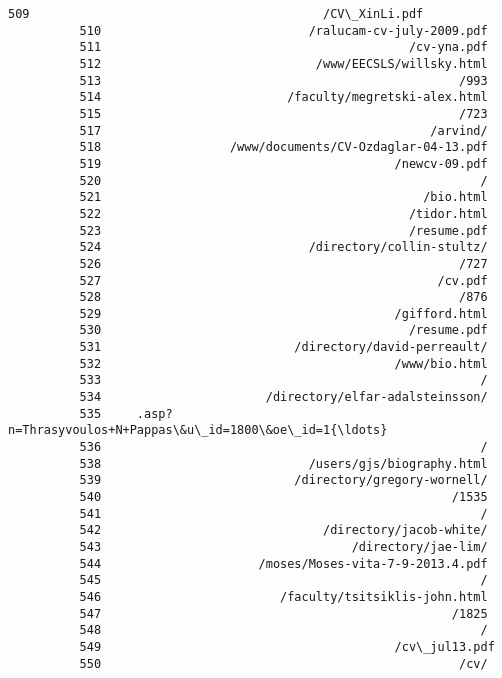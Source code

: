 \documentclass[11pt]{article}
\begin{document}
\begin{Verbatim}[commandchars=\\\{\}]
          509                                         /CV\_XinLi.pdf
          510                             /ralucam-cv-july-2009.pdf
          511                                           /cv-yna.pdf
          512                              /www/EECSLS/willsky.html
          513                                                  /993
          514                          /faculty/megretski-alex.html
          515                                                  /723
          517                                              /arvind/
          518                  /www/documents/CV-Ozdaglar-04-13.pdf
          519                                         /newcv-09.pdf
          520                                                     /
          521                                             /bio.html
          522                                           /tidor.html
          523                                           /resume.pdf
          524                             /directory/collin-stultz/
          526                                                  /727
          527                                               /cv.pdf
          528                                                  /876
          529                                         /gifford.html
          530                                           /resume.pdf
          531                           /directory/david-perreault/
          532                                         /www/bio.html
          533                                                     /
          534                       /directory/elfar-adalsteinsson/
          535     .asp?n=Thrasyvoulos+N+Pappas\&u\_id=1800\&oe\_id=1{\ldots}
          536                                                     /
          538                             /users/gjs/biography.html
          539                           /directory/gregory-wornell/
          540                                                 /1535
          541                                                     /
          542                               /directory/jacob-white/
          543                                   /directory/jae-lim/
          544                      /moses/Moses-vita-7-9-2013.4.pdf
          545                                                     /
          546                         /faculty/tsitsiklis-john.html
          547                                                 /1825
          548                                                     /
          549                                         /cv\_jul13.pdf
          550                                                  /cv/

\end{Verbatim}
\end{document}
